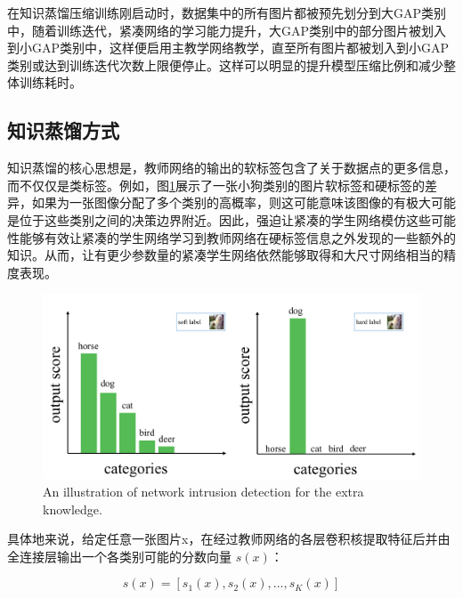 在知识蒸馏压缩训练刚启动时，数据集中的所有图片都被预先划分到大GAP类别中，随着训练迭代，紧凑网络的学习能力提升，大GAP类别中的部分图片被划入到小GAP类别中，这样便启用主教学网络教学，直至所有图片都被划入到小GAP类别或达到训练迭代次数上限便停止。这样可以明显的提升模型压缩比例和减少整体训练耗时。


\subsection{知识蒸馏方式}
知识蒸馏的核心思想是，教师网络的输出的软标签包含了关于数据点的更多信息，而不仅仅是类标签。例如，图\ref{label}展示了一张小狗类别的图片软标签和硬标签的差异，如果为一张图像分配了多个类别的高概率，则这可能意味该图像的有极大可能是位于这些类别之间的决策边界附近。因此，强迫让紧凑的学生网络模仿这些可能性能够有效让紧凑的学生网络学习到教师网络在硬标签信息之外发现的一些额外的知识。从而，让有更少参数量的紧凑学生网络依然能够取得和大尺寸网络相当的精度表现。

\begin{figure}[ht]
	\centering
	\includegraphics[width=1\textwidth]{figures/label.pdf}
	\caption{An illustration of network intrusion detection for the extra knowledge.}
	\label{label}
\end{figure}



具体地来说，给定任意一张图片x，在经过教师网络的各层卷积核提取特征后并由全连接层输出一个各类别可能的分数向量 $s(x)$：

\begin{equation}
s(x) = [s_1(x),s_2(x),...,s_K(x)]
\end{equation}

